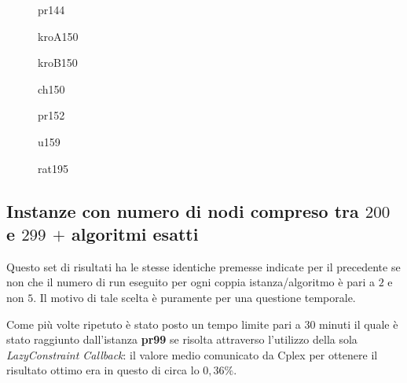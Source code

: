 \documentclass[11pt]{article}
\begin{document}
\begin{figure}[htbp]
\centering
{}
\label{fig:pr144}
\caption{pr144}
\end{figure}

\begin{figure}[htbp]
\centering
{}
\label{fig:kroA150}
\caption{kroA150}
\end{figure}

\begin{figure}[htbp]
\centering
{}
\label{fig:kroB150}
\caption{kroB150}
\end{figure}

\begin{figure}[htbp]
\centering
{}
\label{fig:ch150}
\caption{ch150}
\end{figure}

\begin{figure}[htbp]
\centering
{}
\label{fig:pr152}
\caption{pr152}
\end{figure}

\begin{figure}[htbp]
\centering
{}
\label{fig:u159}
\caption{u159}
\end{figure}

\begin{figure}[htbp]
\centering
{}
\label{fig:rat195}
\caption{rat195}
\end{figure}

\FloatBarrier

\subsection*{Instanze con numero di nodi compreso tra \textbf{$200$} e \textbf{$299$} $+$ algoritmi esatti}

Questo set di risultati ha le stesse identiche premesse indicate per il precedente se non che il numero di run eseguito per ogni coppia istanza/algoritmo è pari a $2$ e non $5$. Il motivo di tale scelta è puramente per una questione temporale.

Come più volte ripetuto è stato posto un tempo limite pari a $30$ minuti il quale è stato raggiunto dall'istanza \textbf{pr99} se risolta attraverso l'utilizzo della sola \textit{LazyConstraint Callback}: il valore medio comunicato da Cplex per ottenere il risultato ottimo era in questo di circa lo $0,36\%$.
\end{document}
